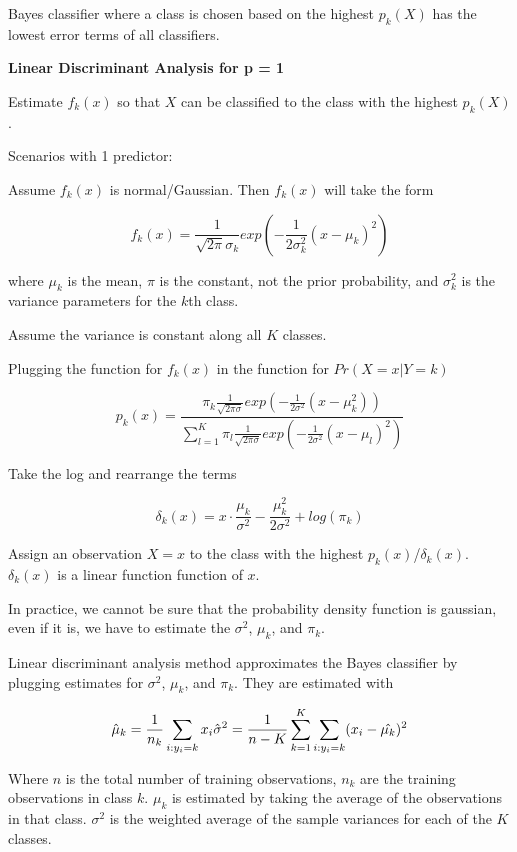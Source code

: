 \documentclass[
]{article}
\begin{document}
Bayes classifier where a class is chosen based on the highest \(p_k(X)\)
has the lowest error terms of all classifiers.

\textbf{Linear Discriminant Analysis for p = 1}

Estimate \(f_k(x)\) so that \(X\) can be classified to the class with
the highest \(p_k(X)\).

Scenarios with 1 predictor:

Assume \(f_k(x)\) is normal/Gaussian. Then \(f_k(x)\) will take the form

\[f_k(x) = \frac{1}{\sqrt{2\pi}\sigma_k}exp(-\frac{1}{2\sigma_k^2}(x-\mu_k)^2)\]

where \(\mu_k\) is the mean, \(\pi\) is the constant, not the prior
probability, and \(\sigma^2_k\) is the variance parameters for the
\(k\)th class.

Assume the variance is constant along all \(K\) classes.

Plugging the function for \(f_k(x)\) in the function for \(Pr(X=x|Y=k)\)

\[p_k(x) = \frac{\pi_k\frac{1}{\sqrt{2\pi\sigma}}exp(-\frac{1}{2\sigma^2}(x-\mu_k^2))}{\sum^K_{l=1}\pi_l\frac{1}{\sqrt{2\pi\sigma}}exp(-\frac{1}{2\sigma^2}(x-\mu_l)^2)}\]

Take the log and rearrange the terms

\[\delta_k(x) = x \cdot \frac{\mu_k}{\sigma^2} - \frac{\mu^2_k}{2\sigma^2} + log(\pi_k)\]

Assign an observation \(X=x\) to the class with the highest
\(p_k(x)\)/\(\delta_k(x)\). \(\delta_k(x)\) is a linear function
function of \(x\).

In practice, we cannot be sure that the probability density function is
gaussian, even if it is, we have to estimate the \(\sigma^2\),
\(\mu_k\), and \(\pi_k\).

Linear discriminant analysis method approximates the Bayes classifier by
plugging estimates for \(\sigma^2\), \(\mu_k\), and \(\pi_k\). They are
estimated with

\[\hat{\mu}_k = \frac{1}{n_k}\sum_{i:y_i=k}x_i \\
\hat{\sigma}^2 = \frac{1}{n-K}\sum^K_{k=1}\sum_{i:y_i=k}(x_i-\hat{\mu_k})^2\]

Where \(n\) is the total number of training observations, \(n_k\) are
the training observations in class \(k\). \(\mu_k\) is estimated by
taking the average of the observations in that class. \(\sigma^2\) is
the weighted average of the sample variances for each of the \(K\)
classes.
\end{document}
